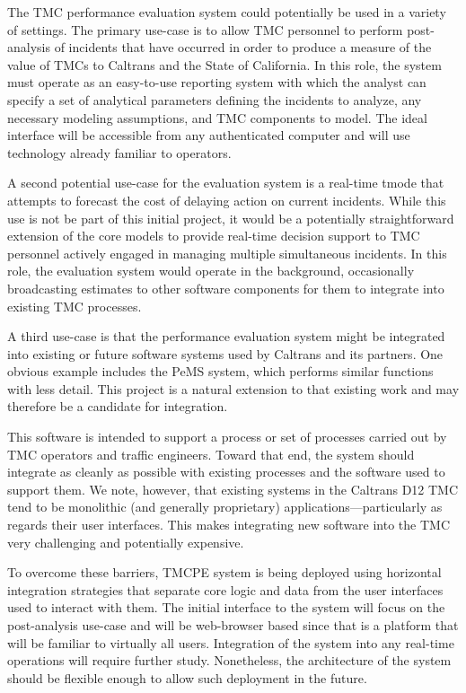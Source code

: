 \documentclass[12pt]{report}
\newcounter{time}
\begin{document}
The \ac{TMC} performance evaluation system could potentially be used in a
variety of settings. The primary use-case is to allow \ac{TMC} personnel to
perform post-analysis of incidents that have occurred in order to produce a
measure of the value of \acp{TMC} to Caltrans and the State of California. In
this role, the system must operate as an easy-to-use reporting system with which
the analyst can specify a set of analytical parameters defining the incidents to
analyze, any necessary modeling assumptions, and \ac{TMC} components to
model. The ideal interface will be accessible from any authenticated computer
and will use technology already familiar to operators.

A second potential use-case for the evaluation system is a real-time tmode that
attempts to forecast the cost of delaying action on current incidents. While
this use is not be part of this initial project, it would be a potentially
straightforward extension of the core models to provide real-time decision
support to \ac{TMC} personnel actively engaged in managing multiple simultaneous
incidents. In this role, the evaluation system would operate in the background,
occasionally broadcasting estimates to other software components for them to
integrate into existing \ac{TMC} processes.

A third use-case is that the performance evaluation system might be integrated
into existing or future software systems used by Caltrans and its partners. One
obvious example includes the \ac{PeMS} system, which performs similar functions
with less detail. This project is a natural extension to that existing work and
may therefore be a candidate for integration.

This software is intended to support a process or set of processes carried out
by \ac{TMC} operators and traffic engineers.  Toward that end, the system should
integrate as cleanly as possible with existing processes and the software used
to support them.  We note, however, that existing systems in the Caltrans
\ac{D12} \ac{TMC} tend to be monolithic (and generally proprietary)
applications---particularly as regards their user interfaces.  This makes
integrating new software into the \ac{TMC} very challenging and potentially
expensive.

To overcome these barriers, \ac{TMCPE} system is being deployed using horizontal
integration strategies that separate core logic and data from the user
interfaces used to interact with them.  The initial interface to the system will
focus on the post-analysis use-case and will be web-browser based since that is
a platform that will be familiar to virtually all users.  Integration of the
system into any real-time operations will require further study.  Nonetheless,
the architecture of the system should be flexible enough to allow such
deployment in the future.
\end{document}
